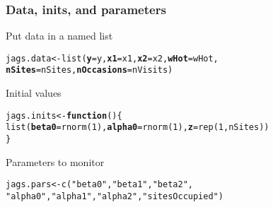 \documentclass[color=usenames,dvipsnames]{beamer}\usepackage[]{graphicx}\usepackage[]{color}
\makeatletter
\newcommand{\hlnum}[1]{\textcolor[rgb]{0.69,0.494,0}{#1}}%
\newcommand{\hlstr}[1]{\textcolor[rgb]{0.749,0.012,0.012}{#1}}%
\newcommand{\hlstd}[1]{\textcolor[rgb]{0,0,0}{#1}}%
\newcommand{\hlkwa}[1]{\textcolor[rgb]{0,0,0}{\textbf{#1}}}%
\newcommand{\hlkwb}[1]{\textcolor[rgb]{0,0.341,0.682}{#1}}%
\newcommand{\hlkwc}[1]{\textcolor[rgb]{0,0,0}{\textbf{#1}}}%
\newcommand{\hlkwd}[1]{\textcolor[rgb]{0.004,0.004,0.506}{#1}}%
\newenvironment{kframe}{%
 \def\at@end@of@kframe{}%
 \ifinner\ifhmode%
  \def\at@end@of@kframe{\end{minipage}}%
  \begin{minipage}{\columnwidth}%
 \fi\fi%
 \def\FrameCommand##1{\hskip\@totalleftmargin \hskip-\fboxsep
 \colorbox{shadecolor}{##1}\hskip-\fboxsep
     \hskip-\linewidth \hskip-\@totalleftmargin \hskip\columnwidth}%
 \MakeFramed {\advance\hsize-\width
   \@totalleftmargin\z@ \linewidth\hsize
   \@setminipage}}%
 {\par\unskip\endMakeFramed%
 \at@end@of@kframe}
\newenvironment{knitrout}{}{} %
\makeatother
\begin{document}
\begin{frame}[fragile]
  \frametitle{Data, inits, and parameters}
  Put data in a named list
  \vspace{-12pt}
\begin{knitrout}\small
{}\color{fgcolor}\begin{kframe}
\begin{alltt}
\hlstd{jags.data} \hlkwb{<-} \hlkwd{list}\hlstd{(}\hlkwc{y}\hlstd{=y,} \hlkwc{x1}\hlstd{=x1,} \hlkwc{x2}\hlstd{=x2,} \hlkwc{wHot}\hlstd{=wHot,}
                  \hlkwc{nSites}\hlstd{=nSites,} \hlkwc{nOccasions}\hlstd{=nVisits)}
\end{alltt}
\end{kframe}
\end{knitrout}
\pause
\vfill
  Initial values
  \vspace{-12pt}
\begin{knitrout}\small
{}\color{fgcolor}\begin{kframe}
\begin{alltt}
\hlstd{jags.inits} \hlkwb{<-} \hlkwa{function}\hlstd{() \{}
    \hlkwd{list}\hlstd{(}\hlkwc{beta0}\hlstd{=}\hlkwd{rnorm}\hlstd{(}\hlnum{1}\hlstd{),} \hlkwc{alpha0}\hlstd{=}\hlkwd{rnorm}\hlstd{(}\hlnum{1}\hlstd{),} \hlkwc{z}\hlstd{=}\hlkwd{rep}\hlstd{(}\hlnum{1}\hlstd{, nSites))}
\hlstd{\}}
\end{alltt}
\end{kframe}
\end{knitrout}
\pause
\vfill
  Parameters to monitor
  \vspace{-12pt}
\begin{knitrout}\small
{}\color{fgcolor}\begin{kframe}
\begin{alltt}
\hlstd{jags.pars} \hlkwb{<-} \hlkwd{c}\hlstd{(}\hlstr{"beta0"}\hlstd{,} \hlstr{"beta1"}\hlstd{,} \hlstr{"beta2"}\hlstd{,}
               \hlstr{"alpha0"}\hlstd{,} \hlstr{"alpha1"}\hlstd{,} \hlstr{"alpha2"}\hlstd{,} \hlstr{"sitesOccupied"}\hlstd{)}
\end{alltt}
\end{kframe}
\end{knitrout}
\end{frame}
\end{document}
